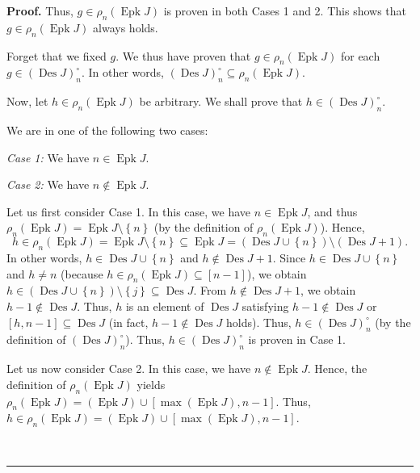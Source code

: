 \documentclass[numbers=enddot,12pt,final,onecolumn,notitlepage]{scrartcl}%
\theoremstyle{definition}
\newenvironment{proof}[1][Proof]{\noindent\textbf{#1.} }{\ \rule{0.5em}{0.5em}}
\begin{document}
\begin{proof}
Thus, $g\in\rho_{n}\left(  \operatorname*{Epk}J\right)  $ is proven in both
Cases 1 and 2. This shows that $g\in\rho_{n}\left(  \operatorname*{Epk}%
J\right)  $ always holds.

Forget that we fixed $g$. We thus have proven that $g\in\rho_{n}\left(
\operatorname*{Epk}J\right)  $ for each $g\in\left(  \operatorname*{Des}%
J\right)  _{n}^{\circ}$. In other words, $\left(  \operatorname*{Des}J\right)
_{n}^{\circ}\subseteq\rho_{n}\left(  \operatorname*{Epk}J\right)  $.

Now, let $h\in\rho_{n}\left(  \operatorname*{Epk}J\right)  $ be arbitrary. We
shall prove that $h\in\left(  \operatorname*{Des}J\right)  _{n}^{\circ}$.

We are in one of the following two cases:

\textit{Case 1:} We have $n\in\operatorname*{Epk}J$.

\textit{Case 2:} We have $n\notin\operatorname*{Epk}J$.

Let us first consider Case 1. In this case, we have $n\in\operatorname*{Epk}%
J$, and thus $\rho_{n}\left(  \operatorname*{Epk}J\right)
=\operatorname*{Epk}J\setminus\left\{  n\right\}  $ (by the definition of
$\rho_{n}\left(  \operatorname*{Epk}J\right)  $). Hence,
\[
h\in\rho_{n}\left(  \operatorname*{Epk}J\right)  =\operatorname*{Epk}%
J\setminus\left\{  n\right\}  \subseteq\operatorname*{Epk}J=\left(
\operatorname*{Des}J\cup\left\{  n\right\}  \right)  \setminus\left(
\operatorname*{Des}J+1\right)  .
\]
In other words, $h\in\operatorname*{Des}J\cup\left\{  n\right\}  $ and
$h\notin\operatorname*{Des}J+1$. Since $h\in\operatorname*{Des}J\cup\left\{
n\right\}  $ and $h\neq n$ (because $h\in\rho_{n}\left(  \operatorname*{Epk}%
J\right)  \subseteq\left[  n-1\right]  $), we obtain $h\in\left(
\operatorname*{Des}J\cup\left\{  n\right\}  \right)  \setminus\left\{
j\right\}  \subseteq\operatorname*{Des}J$. From $h\notin\operatorname*{Des}%
J+1$, we obtain $h-1\notin\operatorname*{Des}J$. Thus, $h$ is an element of
$\operatorname*{Des}J$ satisfying $h-1\notin\operatorname*{Des}J$ or $\left[
h,n-1\right]  \subseteq\operatorname*{Des}J$ (in fact, $h-1\notin%
\operatorname*{Des}J$ holds). Thus, $h\in\left(  \operatorname*{Des}J\right)
_{n}^{\circ}$ (by the definition of $\left(  \operatorname*{Des}J\right)
_{n}^{\circ}$). Thus, $h\in\left(  \operatorname*{Des}J\right)  _{n}^{\circ}$
is proven in Case 1.

Let us now consider Case 2. In this case, we have $n\notin\operatorname*{Epk}%
J$. Hence, the definition of $\rho_{n}\left(  \operatorname*{Epk}J\right)  $
yields $\rho_{n}\left(  \operatorname*{Epk}J\right)  =\left(
\operatorname*{Epk}J\right)  \cup\left[  \max\left(  \operatorname*{Epk}%
J\right)  ,n-1\right]  $. Thus, $h\in\rho_{n}\left(  \operatorname*{Epk}%
J\right)  =\left(  \operatorname*{Epk}J\right)  \cup\left[  \max\left(
\operatorname*{Epk}J\right)  ,n-1\right]  $.


\end{proof}
\end{document}
